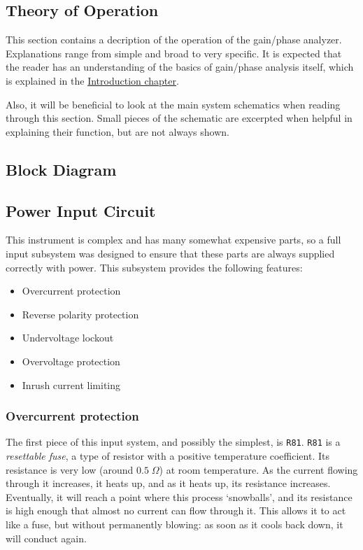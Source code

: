 \documentclass[article,oneside]{memoir}
\newcommand{\refdes}[1]{\texttt{#1}}
\begin{document}
\begin{multicols}{2}

\chapter{Theory of Operation}

This section contains a decription of the operation of the gain/phase analyzer.
Explanations range from simple and broad to very specific.
It is expected that the reader has an understanding of the basics of
gain/phase analysis itself, which is explained in the \hyperref[chap:intro]{Introduction
chapter}.

Also, it will be beneficial to look at the main system schematics when reading
through this section. Small pieces of the schematic are excerpted when helpful
in explaining their function, but are not always shown.

\section{Block Diagram}

\section{Power Input Circuit}

This instrument is complex and has many somewhat expensive parts, so a full
input subsystem was designed to ensure that these parts are always supplied
correctly with power. This subsystem provides the following features:

\begin{itemize}
\item{Overcurrent protection}
\item{Reverse polarity protection}
\item{Undervoltage lockout}
\item{Overvoltage protection}
\item{Inrush current limiting}
\end{itemize}

\subsection{Overcurrent protection}

The first piece of this input system, and possibly the simplest, is
\refdes{R81}. \refdes{R81} is a \emph{resettable fuse}, a type of resistor
with a positive temperature coefficient. Its resistance is very low
(around $0.5\;\Omega$) at room temperature.  As the current flowing through it
increases, it heats up, and as it heats up, its resistance increases.
Eventually, it will reach a point where this process `snowballs', and its
resistance is high enough that almost no current can flow through it. This
allows it to act like a fuse, but without permanently blowing: as soon as it
cools back down, it will conduct again.


\end{multicols}
\end{document}
